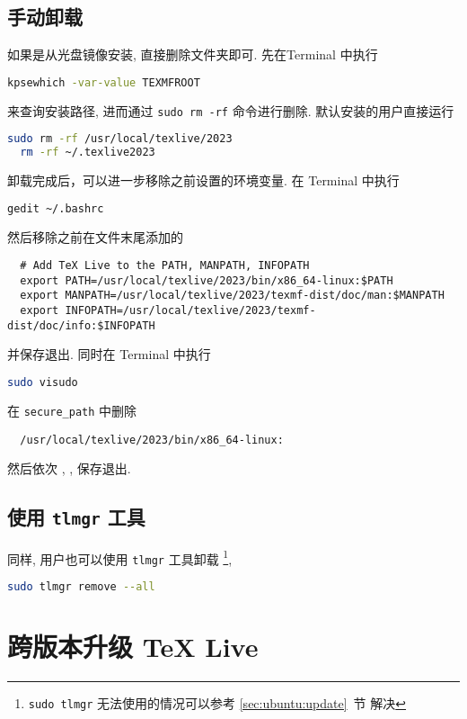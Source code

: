 \subsection{手动卸载}

如果是从光盘镜像安装,
直接删除文件夹即可.
先在\textsf{Terminal} 中执行
\begin{lstlisting}[language = bash]
  kpsewhich -var-value TEXMFROOT
\end{lstlisting}
来查询安装路径,
进而通过 \texttt{sudo rm -rf} 命令进行删除.
默认安装的用户直接运行
\begin{lstlisting}[language = bash]
  sudo rm -rf /usr/local/texlive/2023
  rm -rf ~/.texlive2023
\end{lstlisting}
卸载完成后，可以进一步移除之前设置的环境变量.
在 \textsf{Terminal} 中执行
\begin{lstlisting}[language = bash]
  gedit ~/.bashrc
\end{lstlisting}
然后移除之前在文件末尾添加的
\begin{lstlisting}
  # Add TeX Live to the PATH, MANPATH, INFOPATH
  export PATH=/usr/local/texlive/2023/bin/x86_64-linux:$PATH
  export MANPATH=/usr/local/texlive/2023/texmf-dist/doc/man:$MANPATH
  export INFOPATH=/usr/local/texlive/2023/texmf-dist/doc/info:$INFOPATH
\end{lstlisting}
并保存退出.
同时在 \textsf{Terminal} 中执行
\begin{lstlisting}[language = bash]
  sudo visudo
\end{lstlisting}
在 \texttt{secure\_path} 中删除
\begin{lstlisting}
  /usr/local/texlive/2023/bin/x86_64-linux:
\end{lstlisting}
然后依次 , , \keys{\enter} 保存退出.

\subsection{使用 \texttt{tlmgr} 工具}

同样,
用户也可以使用 \texttt{tlmgr} 工具卸载%
\footnote{\texttt{sudo tlmgr} 无法使用的情况可以参考 \ref{sec:ubuntu:update}~节 解决},
\begin{lstlisting}[language=bash]
  sudo tlmgr remove --all
\end{lstlisting}

\section{跨版本升级 \TeX{} Live}\label{sec:ubuntu:version}

